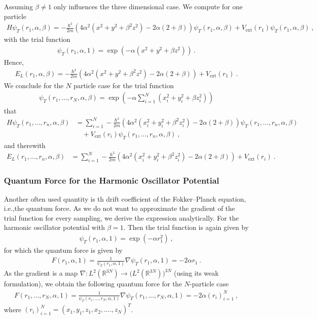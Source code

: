 \documentclass[11pt,a4paper]{article}
\numberwithin{equation}{section}
\begin{document}
Assuming $\beta\neq 1 $ only influences the three dimensional case. 
%
We compute for one particle
\begin{align*}
H \psi_T(r_1,\alpha,\beta)
=
-\frac{\hbar^2}{2m}\left(4\alpha^2(x^2+y^2+\beta^2z^2)-2\alpha (2+\beta)\right)\psi_T(r_1,\alpha,\beta)+V_{\mathrm{ext}}(r_1)\psi_T(r_1,\alpha,\beta)~,
\end{align*}
with the trial function
\begin{align*}
\psi_T(r_1,\alpha,1) = \exp(-\alpha (x^2+y^2+\beta z^2))~.
\end{align*}
Hence,
\begin{align*}
E_{L}(r_1,\alpha,\beta)
=
-\frac{\hbar^2}{2m}\left(4\alpha^2(x^2+y^2+\beta^2z^2)-2\alpha (2+\beta)\right)+V_{\mathrm{ext}}(r_1)~.
\end{align*}
We conclude for the $N$ particle case for the trial function
\begin{align*}
\psi_T(r_1,...,r_N,\alpha,\beta) = \exp(-\alpha \sum_{i=1}^{N}(x_i^2+y_i^2+\beta z_i^2))
\end{align*}
that
\begin{align*}
H \psi_T(r_1,...,r_n,\alpha,\beta)
&=
\sum_{i=1}^N-\frac{\hbar^2}{2m}\left(4\alpha^2(x_i^2+y_i^2+\beta^2z_i^2)-2\alpha (2+\beta)\right)\psi_T(r_1,...,r_n,\alpha,\beta)\\
&\quad +V_{\mathrm{ext}}(r_i)\psi_T(r_1,...,r_n,\alpha,\beta)~,
\end{align*}
and therewith
\begin{align*}
E_L(r_1,...,r_n,\alpha,\beta)
&=
\sum_{i=1}^N-\frac{\hbar^2}{2m}\left(4\alpha^2(x_i^2+y_i^2+\beta^2z_i^2)-2\alpha (2+\beta)\right)+V_{\mathrm{ext}}(r_i)~.
\end{align*}

\subsubsection{Quantum Force for the Harmonic Oscillator Potential}
%
%
Another often used quantity is th drift coefficient of the Fokker--Planck equation, i.e.,the quantum force. 
%
As we do not want to approximate the gradient of the trial function for every sampling, we derive the expression analytically.
%
For the harmonic oscillator potential with $\beta =1$.
%
Then the trial function is again given by    
\begin{align*}
\psi_T(r_1,\alpha,1) = \exp(-\alpha r_1^2)~,
\end{align*}
for which the quantum force is given by
\begin{align*}
F(r_1,\alpha,1) = \frac{1}{\psi_T(r_1,\alpha,1)}\nabla \psi_T(r_1,\alpha,1)
=
-2\alpha r_1~.
\end{align*}
As the gradient is a map $\nabla:L^2(\mathbb{R}^{3N})\to \big(L^2(\mathbb{R}^{3N})\big)^{3N}$ (using its weak formulation), we obtain the following quantum force for the $N$-particle case
\begin{align*}
F(r_1,...,r_N,\alpha,1) = \frac{1}{\psi_T(r_1,...,r_N,\alpha,1)}\nabla \psi_T(r_1,...,r_N,\alpha,1)
=
-2\alpha (r_i)_{i=1}^N~,
\end{align*}
where $(r_i)_{i=1}^N = (x_1, y_1 , z_1, x_2,...., z_N)^T$.
\end{document}
